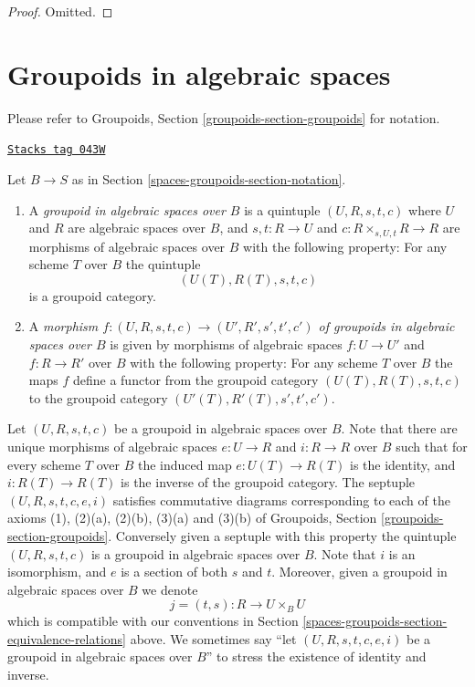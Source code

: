 \begin{proof}
Omitted.
\end{proof}

\section{Groupoids in algebraic spaces}
\label{spaces-groupoids-section-groupoids}
Please refer to
Groupoids, Section \ref{groupoids-section-groupoids}
for notation.

\begin{definition}[Groupoid]
\label{spaces-groupoids-definition-groupoid}
\href{https://stacks.math.columbia.edu/tag/043W}{\texttt{Stacks tag 043W}}

Let $B \to S$ as in Section \ref{spaces-groupoids-section-notation}.
\begin{enumerate}
\item A {\it groupoid in algebraic spaces over $B$} is a
quintuple $(U, R, s, t, c)$ where
$U$ and $R$ are algebraic spaces over $B$, and
$s, t : R \to U$ and $c : R \times_{s, U, t} R \to R$
are morphisms of algebraic spaces over $B$ with the
following property: For any scheme $T$ over $B$ the quintuple
$$
(U(T), R(T), s, t, c)
$$
is a groupoid category.
\item A {\it morphism
$f : (U, R, s, t, c) \to (U', R', s', t', c')$
of groupoids in algebraic spaces over $B$} is given by morphisms
of algebraic spaces $f : U \to U'$ and $f : R \to R'$ over $B$
with the following property:  For any scheme
$T$ over $B$ the maps $f$ define a functor from the
groupoid category $(U(T), R(T), s, t, c)$ to the
groupoid category $(U'(T), R'(T), s', t', c')$.
\end{enumerate}
\end{definition}

Let $(U, R, s, t, c)$ be a groupoid in algebraic spaces over $B$.
Note that there are unique morphisms of algebraic spaces
$e : U \to R$ and $i : R \to R$ over $B$ such that for every scheme $T$
over $B$ the induced map $e : U(T) \to R(T)$ is the identity, and
$i : R(T) \to R(T)$ is the inverse of the groupoid category.
The septuple $(U, R, s, t, c, e, i)$ satisfies commutative diagrams
corresponding to each of the axioms (1), (2)(a), (2)(b), (3)(a) and (3)(b) of
Groupoids, Section \ref{groupoids-section-groupoids}.
Conversely given a septuple with this property the quintuple $(U, R, s, t, c)$
is a groupoid in algebraic spaces over $B$. Note that $i$ is an isomorphism,
and $e$ is a section of both $s$ and $t$.
Moreover, given a groupoid in algebraic spaces over $B$ we denote
$$
j = (t, s) : R \longrightarrow U \times_B U
$$
which is compatible with our conventions in
Section \ref{spaces-groupoids-section-equivalence-relations}
above. We sometimes say ``let $(U, R, s, t, c, e, i)$ be a
groupoid in algebraic spaces over $B$'' to stress the existence of identity and
inverse.


